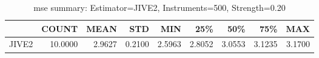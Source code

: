 \begin{table}[ht]
\centering
\caption{mse summary: Estimator=JIVE2, Instruments=500, Strength=0.20}
\begin{tabular}{lrrrrrrrr}
\toprule
 & COUNT & MEAN & STD & MIN & 25\% & 50\% & 75\% & MAX \\
\midrule
JIVE2 & 10.0000 & 2.9627 & 0.2100 & 2.5963 & 2.8052 & 3.0553 & 3.1235 & 3.1700 \\
\bottomrule
\end{tabular}
\end{table}
